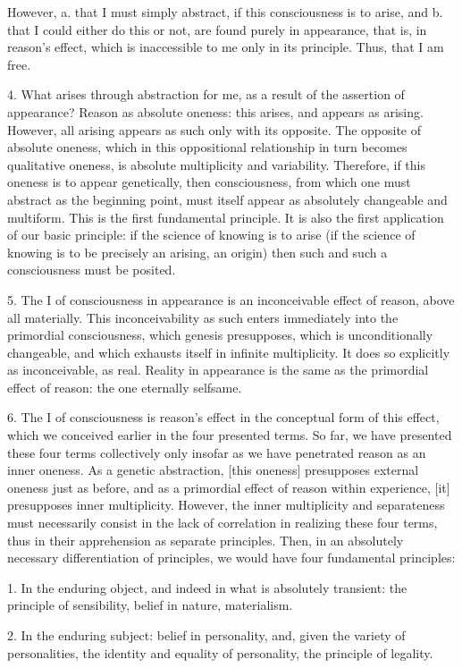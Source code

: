 However, a. that I must simply abstract,
if this consciousness is to arise,
and b. that I could either do this or not,
are found purely in appearance, that is,
in reason's effect,
which is inaccessible to me
only in its principle.
Thus, that I am free.

4. What arises through abstraction for me,
as a result of the assertion of appearance?
Reason as absolute oneness:
this arises, and appears as arising.
However, all arising appears as such
only with its opposite.
The opposite of absolute oneness,
which in this oppositional relationship
in turn becomes qualitative oneness,
is absolute multiplicity and variability.
Therefore, if this oneness is to appear genetically,
then consciousness,
from which one must abstract as the beginning point,
must itself appear as absolutely changeable and multiform.
This is the first fundamental principle.
It is also the first application of our basic principle:
if the science of knowing is to arise
(if the science of knowing is to be
precisely an arising, an origin)
then such and such a consciousness must be posited.

5. The I of consciousness in appearance is
an inconceivable effect of reason,
above all materially.
This inconceivability as such
enters immediately into
the primordial consciousness,
which genesis presupposes,
which is unconditionally changeable,
and which exhausts itself in infinite multiplicity.
It does so explicitly as inconceivable, as real.
Reality in appearance is
the same as the primordial effect of reason:
the one eternally selfsame.

6. The I of consciousness is reason's effect
in the conceptual form of this effect,
which we conceived earlier in the four presented terms.
So far, we have presented these four terms
collectively only insofar as we have
penetrated reason as an inner oneness.
As a genetic abstraction, [this oneness] presupposes
external oneness just as before,
and as a primordial effect of reason within experience,
[it] presupposes inner multiplicity.
However, the inner multiplicity and separateness must
necessarily consist in the lack of correlation
in realizing these four terms,
thus in their apprehension as separate principles.
Then, in an absolutely necessary differentiation of principles,
we would have four fundamental principles:

1. In the enduring object,
and indeed in what is absolutely transient:
the principle of sensibility, belief in nature, materialism.

2. In the enduring subject:
belief in personality,
and, given the variety of personalities,
the identity and equality of personality,
the principle of legality.

